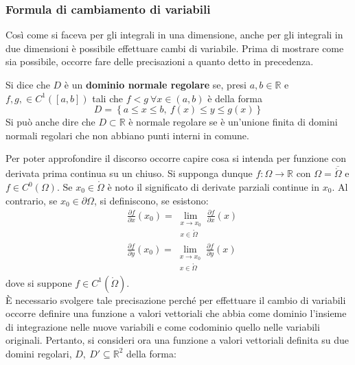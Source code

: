 \subsubsection{Formula di cambiamento di variabili}
Così come si faceva per gli integrali in una dimensione, anche per gli integrali in due dimensioni è possibile effettuare cambi di variabile. Prima di mostrare come sia possibile, occorre fare delle precisazioni a quanto detto in precedenza.
\begin{definition} \label{Def: Dominio regolare}
    Si dice che $D$ è un \textbf{dominio normale regolare} se, presi $a,b \in \mathbb{R}$ e $f,g, \in C^1([a,b])$ tali che $f < g\ \forall x \in (a,b)$ è della forma
    \begin{equation*}
        D= \left\{a \leq x \leq b, \ f(x) \leq y \leq g(x) \right\}
    \end{equation*}
    Si può anche dire che $D \subset \mathbb{R}$ è normale regolare se è un'unione finita di domini normali regolari che non abbiano punti interni in comune.
    \end{definition}
    \vspace*{6pt}
Per poter approfondire il discorso occorre capire cosa si intenda per funzione con derivata prima continua su un chiuso. Si supponga dunque $f: \Omega \to \mathbb{R}$ con $\Omega = \overline{\mathring{\Omega}}$ e $f \in C^0(\Omega)$. Se $x_0 \in \mathring{\Omega}$ è noto il significato di derivate parziali continue in $x_0$. Al contrario, se $x_0 \in \partial \Omega$, si definiscono, se esistono:
\begin{equation*}
\begin{aligned}
    &\frac{\partial{f}}{\partial{x}}(x_0)= \lim_{\substack{x \to x_0 \\ x \in \mathring{\Omega}}} \frac{\partial f}{\partial x}(x)\\
    &\frac{\partial{f}}{\partial{y}}(x_0)= \lim_{\substack{x \to x_0 \\ x \in \mathring{\Omega}}} \frac{\partial f}{\partial y}(x)
\end{aligned}
\end{equation*}
dove si suppone $f \in C^1(\mathring{\Omega})$.\\
È necessario svolgere tale precisazione perché per effettuare il cambio di variabili occorre definire una funzione a valori vettoriali che abbia come dominio l'insieme di integrazione nelle nuove variabili e come codominio quello nelle variabili originali. Pertanto, si consideri ora una funzione a valori vettoriali definita su due domini regolari, $D,\ D' \subseteq \mathbb{R}^2$ della forma:
